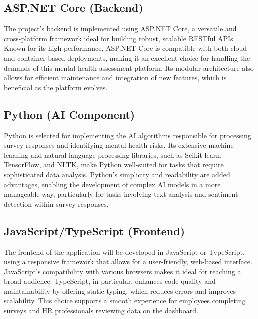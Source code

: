 \documentclass[conference]{IEEEtran}
\begin{document}
\subsection {ASP.NET Core (Backend)}


The project’s backend is implemented using ASP.NET Core, 
a versatile and cross-platform framework ideal for building 
robust, scalable RESTful APIs. Known for its high performance, 
ASP.NET Core is compatible with both cloud and container-based 
deployments, making it an excellent choice for handling the 
demands of this mental health assessment platform. Its modular 
architecture also allows for efficient maintenance and 
integration of new features, which is beneficial as the 
platform evolves.
\newline


\subsection {Python (AI Component)}

    Python is selected for implementing the AI algorithms 
    responsible for processing survey responses and 
    identifying mental health risks. Its extensive machine 
    learning and natural language processing libraries, 
    such as Scikit-learn, TensorFlow, and NLTK, make Python 
    well-suited for tasks that require sophisticated data 
    analysis. Python’s simplicity and readability are added 
    advantages, enabling the development of complex AI 
    models in a more manageable way, particularly for tasks 
    involving text analysis and sentiment detection within 
    survey responses.
\newline


\subsection {JavaScript/TypeScript (Frontend)}

    The frontend of the application will be developed in 
    JavaScript or TypeScript, using a responsive framework 
    that allows for a user-friendly, web-based interface. 
    JavaScript’s compatibility with various browsers makes 
    it ideal for reaching a broad audience. TypeScript, 
    in particular, enhances code quality and maintainability 
    by offering static typing, which reduces errors and 
    improves scalability. This choice supports a smooth 
    experience for employees completing surveys and HR 
    professionals reviewing data on the dashboard.
    \newline
\end{document}
